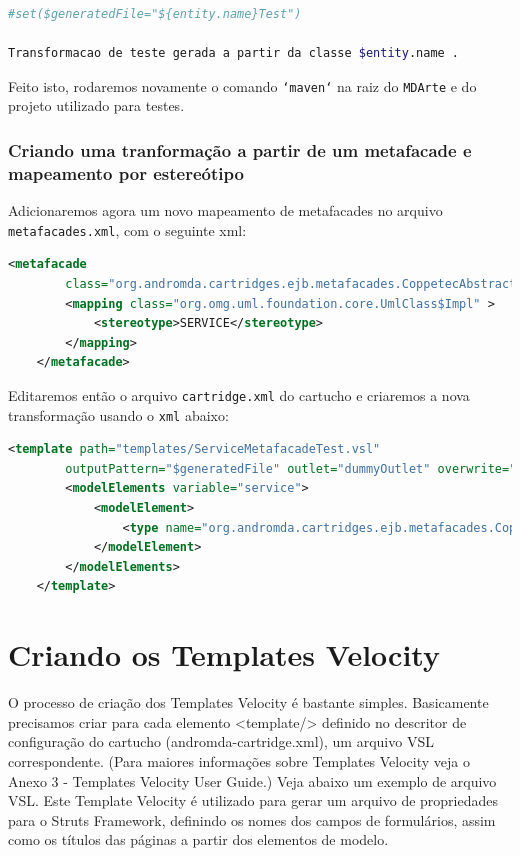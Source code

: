 \begin{lstlisting}[language=bash]
#set($generatedFile="${entity.name}Test")

Transformacao de teste gerada a partir da classe $entity.name .
\end{lstlisting}

Feito isto, rodaremos novamente o comando \texttt{`maven`} na raiz do
\texttt{MDArte} e do projeto utilizado para testes.

\subsubsection{Criando uma tranformação a partir de um metafacade e mapeamento
por estereótipo}
Adicionaremos agora um novo mapeamento de metafacades no arquivo
\texttt{metafacades.xml}, com o seguinte xml:

\begin{lstlisting}[language=xml]
	<metafacade
		class="org.andromda.cartridges.ejb.metafacades.CoppetecAbstractServiceFacadeLogicImpl">
		<mapping class="org.omg.uml.foundation.core.UmlClass$Impl" >
			<stereotype>SERVICE</stereotype> 
		</mapping>
    </metafacade>
\end{lstlisting}


Editaremos então o arquivo \texttt{cartridge.xml} do cartucho e criaremos a nova
transformação usando o \texttt{xml} abaixo:

\begin{lstlisting}[language=xml]
	<template path="templates/ServiceMetafacadeTest.vsl"
		outputPattern="$generatedFile" outlet="dummyOutlet" overwrite="true">
		<modelElements variable="service">
            <modelElement>
                <type name="org.andromda.cartridges.ejb.metafacades.CoppetecAbstractServiceFacadeLogicImpl" />
            </modelElement>
        </modelElements>
    </template>
\end{lstlisting}

\section{Criando os Templates Velocity}
O processo de criação dos Templates Velocity é bastante simples. Basicamente
precisamos criar para cada elemento <template/> definido no descritor de
configuração do cartucho (andromda-cartridge.xml), um arquivo VSL
correspondente. (Para maiores informações sobre Templates Velocity veja o Anexo
3 - Templates Velocity User Guide.) Veja abaixo um exemplo de arquivo VSL. Este
Template Velocity é utilizado para gerar um arquivo de propriedades para o
Struts Framework, definindo os nomes dos campos de formulários, assim como os
títulos das páginas a partir dos elementos de modelo.

